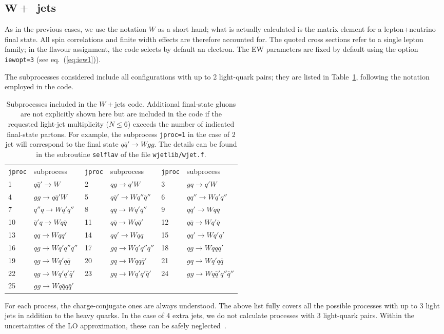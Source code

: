 \documentclass[paper]{JHEP3}
\newcommand{\ccaption}[2]{
    \begin{center}
    \parbox{0.85\textwidth}{
      \caption[#1]{\small{{#2}}}
      }
    \end{center}
    }
\def    \qbar   {\bar{q}}
\begin{document}
\subsection{$\mathbf{W+}$~jets}
\label{sec:wjets}
As in the previous cases, we use the notation $W$ as a short hand; what is
actually calculated is the matrix element for a lepton+neutrino final
state. All spin correlations and finite width effects are therefore
accounted for. The quoted cross sections refer to a single lepton
family; in the flavour assignment, the code selects by default an
electron.
The EW parameters are fixed by default using the option {\tt iewopt=3}
(see eq.~(\ref{eq:iew1})).

 The subprocesses considered include all configurations
with up to 2 light-quark pairs; they are listed in
Table~\ref{tab:wjets}, following the notation employed in the
code.
\begin{table}
\begin{center}
\begin{tabular}{ll|ll|ll}
{\tt jproc} & subprocess & {\tt jproc} & subprocess & {\tt jproc} &
subprocess \\ 
1 &  $q\qbar' \to W  $ 
&2 &  $q g \to q' W  $ 
&3 &  $g q \to q' W  $ 
\\
4 &  $gg \to q \qbar' W  $ 
&5 &  $q\qbar' \to W  q'' \qbar'' $ 
&6 &  $qq'' \to W  q' q'' $ 
\\
7 &  $q'' q \to W  q' q'' $ 
&8 &  $q\qbar \to W  q' \qbar'' $ 
&9 &  $q\qbar' \to W  q \qbar $ 
\\
10 &  $\qbar' q\to W  q \qbar $ 
&11 &  $q\qbar \to W  q \qbar' $ 
&12 &  $q\qbar \to W  q' \qbar $ 
\\
13 &  $q q \to W  q q' $ 
&14 &  $q q' \to W  q q $ 
&15 &  $q q' \to W  q' q' $ 
\\
16 &  $q g \to W  q' q''\qbar'' $ 
&17 &  $g q \to W  q' q''\qbar'' $ 
&18 &  $q g \to W  q q \qbar' $ 
\\
19 &  $q g \to W  q' q \qbar $ 
&20 &  $g q \to W  q q \qbar' $ 
&21 &  $g q \to W  q' q \qbar $ 
\\
22 &  $q g \to W q' q' \qbar' $ 
&23 &  $g q \to W q' q' \qbar' $ 
&24 &  $g g \to W q \qbar' q'' \qbar'' $ 
\\
25 &  $g g \to W q \qbar q \qbar' $ 
& &
& &
\end{tabular}
\ccaption{}{\label{tab:wjets} Subprocesses included in the $W+$jets
  code. Additional final-state gluons are not explicitly 
  shown here but are included in the code if the requested light-jet
  multiplicity ($N\le 6$) exceeds the number of indicated final-state partons.
  For example, the subprocess {\tt jproc=1} in the case of 2 jet
  will correspond to the final state  $q\qbar' \to W g g$.
  The details can be found in the subroutine {\tt selflav} of
  the file {\tt wjetlib/wjet.f}.}
\end{center}
\end{table}
For each process, the charge-conjugate ones are always understood.
The above list fully covers all the possible processes with up to 3
light jets in addition to the heavy quarks. In the case of 4 extra
jets, we do not calculate processes with 3 light-quark pairs. Within
the uncertainties of the LO approximation, these can be safely
neglected~\cite{Berends:1991ax}.
\end{document}

